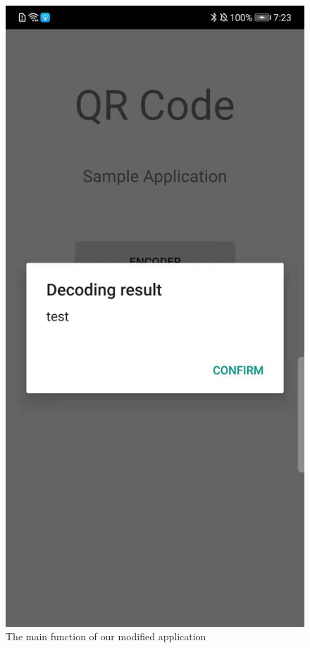 \documentclass[12pt, a4paper]{article}
\theoremstyle{definition}
\begin{document}
\begin{figure}[htbp]
\begin{minipage}[t]{0.2\linewidth}
		\end{minipage}
		\begin{minipage}[t]{0.2\linewidth}
		\centering
		\includegraphics[width=\linewidth]{6-7.jpeg}
		\end{minipage}
	\caption{The main function of our modified application}\label{fig6}
\end{figure}
\end{document}
